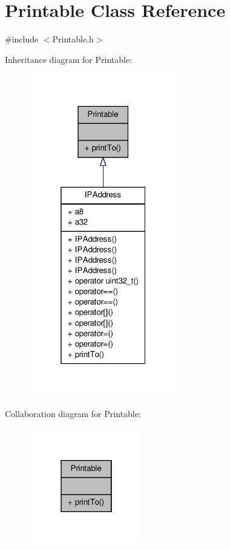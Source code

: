 \hypertarget{class_printable}{\section{Printable Class Reference}
\label{class_printable}
}


{\ttfamily \#include $<$Printable.\-h$>$}



Inheritance diagram for Printable\-:
\nopagebreak
\begin{figure}[H]
\begin{center}
\leavevmode
\includegraphics[width=184pt]{class_printable__inherit__graph}
\end{center}
\end{figure}


Collaboration diagram for Printable\-:
\nopagebreak
\begin{figure}[H]
\begin{center}
\leavevmode
\includegraphics[width=142pt]{class_printable__coll__graph}
\end{center}
\end{figure}
